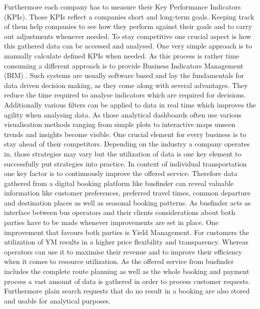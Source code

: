 Furthermore each company has to measure their Key Performance Indicators (KPIs). Those KPIs reflect a companies short and long-term goals. Keeping track of them help companies to see how they perform against their goals and to carry out adjustments whenever needed.\cite{kpi_imrpove_businiess} To stay competitive one crucial aspect is how this gathered data can be accessed and analysed. One very simple approach is to manually calculate defined KPIs when needed. As this process is rather time consuming a different approach is to provide Business Indicators Management (BIM) \cite{kpi_imrpove_decision_making}. Such systems are usually software based and lay the fundamentals for data driven decision making, as they come along with several advantages. They reduce the time required to analyse indicators which are required for decisions. Additionally various filters can be applied to data in real time which improves the agility when analysing data. As those analytical dashboards often use various visualisation methods ranging from simple plots to interactive maps unseen trends and insights become visible.
\newline
\newline 
One crucial element for every business is to stay ahead of their competitors. Depending on the industry a company operates in, those strategies may vary but the utilization of data is one key element to successfully put strategies into practice.
In context of individual transportation one key factor is to continuously improve the offered service. Therefore data gathered from a digital booking platform like busfinder can reveal valuable information like customer preferences, preferred travel times, common departure and destination places as well as seasonal booking patterns.
\newline
\newline
As busfinder acts as interface between bus operators and their clients considerations about both parties have to be made whenever improvements are set in place. One improvement that favours both parties is Yield Management. For customers the utilization of YM results in a higher price flexibility and transparency. Whereas operators can use it to maximise their revenue and to improve their efficiency when it comes to resource utilization.\cite{yield_m} As the offered service from busfinder includes the complete route planning as well as the whole booking and payment process a vast amount of data is gathered in order to process customer requests. Furthermore plain search requests that do no result in a booking are also stored and usable for analytical purposes.

